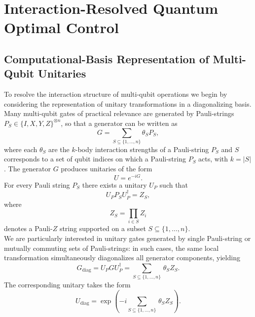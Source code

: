 \documentclass[
  aps,
  pra,
  reprint,            %
  superscriptaddress, %
  amsmath,amssymb,
  notitlepage
]{revtex4-2}
\theoremstyle{plain}
\theoremstyle{definition}
\theoremstyle{definition}
\begin{document}
\section{Interaction-Resolved Quantum Optimal Control}
\label{sec:interaction_resolved_representation}

\subsection{Computational-Basis Representation of Multi-Qubit Unitaries}
\label{sec:comp_frame}
\noindent
To resolve the interaction structure of multi-qubit operations we begin by considering the representation of unitary transformations in a diagonalizing basis. Many multi-qubit gates of practical relevance are generated by Pauli-strings $P_S \in \{I,X,Y,Z\}^{\otimes n}$, so that a generator can be written as
\begin{equation}
G = \sum_{S\subseteq\{1,\dots,n\}} \theta_S P_S,
\label{eq:generator_theta}
\end{equation}
where each $\theta_S$ are the $k$-body interaction strengths of a Pauli-string $P_S$ and $S$ corresponds to a set of qubit indices on which a Pauli-string $P_S$ acts,  with $k=|S|$. The generator $G$ produces unitaries of the form
\begin{equation}
U = e^{-iG}.
\end{equation}
For every Pauli string $P_S$ there exists a unitary $U_P$ such that
\begin{equation}
U_P P_S U_P^\dagger =  Z_S,
\end{equation}
where 
\begin{equation}
Z_S = \prod_{i\in S} Z_i
\end{equation}
denotes a Pauli-$Z$ string supported on a subset $S \subseteq \{1,\dots,n\}$.\\

\noindent
We are particularly interested in unitary gates generated by single Pauli-string or mutually commuting sets of Pauli-strings: in such cases, the same local transformation simultaneously diagonalizes all generator components, yielding 
\begin{equation}
G_{\mathrm{diag}}= U_P G U_P^\dagger = \sum_{S\subseteq\{1,\dots,n\}}\, \theta_S Z_S.
\label{eq:diag_generator}
\end{equation}
The corresponding unitary takes the form
\begin{equation}
    U_{\mathrm{diag}} = \exp\!\left(
    -i \sum_{S\subseteq\{1,\dots,n\}}\, \theta_S Z_S \right).
    \label{eq:diag_unitary}
\end{equation}
\end{document}
